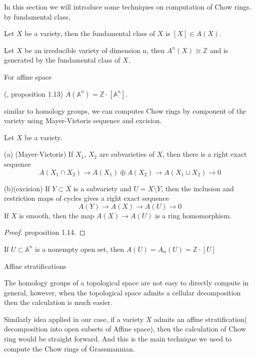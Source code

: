 \documentclass[12pt]{article}
\newcommand{\rexact}[3]{ #1 \longrightarrow #2 \longrightarrow #3 \longrightarrow 0}
\begin{document}
In this section we will introduce some techniques on computation of Chow rings.
by fundamental class, 

\begin{df}
    Let $X$ be a variety, then the fundamental class of $X$ is $[X] \in A(X)$. 
\end{df}

\begin{thm}
    Let $X$ be an irreducible variety of dimension n, then $A^{n}(X) \cong \mathbb{Z}$ and is generated by the fundamental class of $X$.
\end{thm}

For affine space

\begin{eg}(\cite{3264}, proposition 1.13)
    $A(\mathbb{A}^{n}) = \mathbb{Z} \cdot [\mathbb{A}^{n}].$

\end{eg}

similar to homology groups, we can computes Chow rings by component of the variety using Mayer-Vietoris sequence and excision.

\begin{thm}
    Let $X$ be a variety.

    (a) (Mayer-Vietoris) If $X_{1}$, $X_{2}$ are subvarieties of $X$, then there is a right exact sequence
    \[\rexact{A(X_{1}\cap X_{2})}{A(X_{1})\oplus A(X_{2})}{A(X_{1}\cup X_{2})} \]

    (b)(excision) If $Y \subset X$ is a subvariety and $U = X \setminus Y$, then the inclusion and restriction maps of cycles gives a right exact sequence
    \[\rexact{A(Y)}{A(X)}{A(U)} \]
    If $X$ is smooth, then the map $A(X) \longrightarrow A(U)$ is a ring homomorphism.
\end{thm}

\begin{proof}
    \cite{3264}proposition 1.14.
\end{proof}


\begin{cor}
    If $U \subset \mathbb{A}^{n}$ is a nonempty open set, then $A(U) = A_{n}(U) = \mathbb{Z} \cdot [U]$
\end{cor}

Affine stratifications 

The homology groups of a topological space are not easy to directly compute in general, however, when the topological space admits a cellular decomposition then the calculation is much easier.

Similarly idea applied in our case, if a variety $X$ admits an affine stratification( decomposition into open subsets of Affine space), then the calculation of Chow ring would be straight forward. And this is the main technique we used to compute the Chow rings of Grassmannian.
\end{document}
